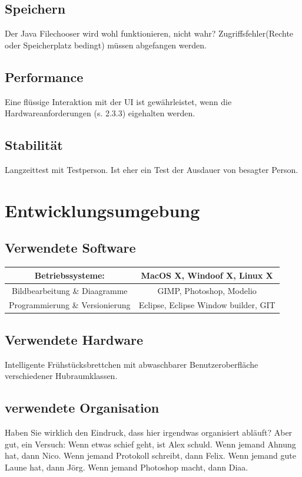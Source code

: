\documentclass[11pt,a4paper]{article}
\begin{document}
\subsection{Speichern}
Der Java Filechooser wird wohl funktionieren, nicht wahr?
Zugriffsfehler(Rechte oder Speicherplatz bedingt) müssen abgefangen werden.


\subsection{Performance}
Eine flüssige Interaktion mit der UI ist gewährleistet, wenn die Hardwareanforderungen (s. 2.3.3) eigehalten werden.

\subsection {Stabilität}
Langzeittest mit Testperson.
Ist eher ein Test der Ausdauer von besagter Person.
\section{Entwicklungsumgebung}
\subsection{Verwendete Software}
\begin{tabular}{|c|c|}
\hline
Betriebssysteme:     &  MacOS X, Windoof X, Linux X
  \\
     \hline
     Bildbearbeitung  \&  Diaagramme & 
         GIMP, Photoshop, Modelio
 \\
     \hline
     Programmierung  \& Versionierung & 
          Eclipse, 
          Eclipse Window builder,
          GIT\\
     \hline
\end{tabular}
\subsection{Verwendete Hardware}
Intelligente Frühstücksbrettchen mit abwaschbarer Benutzeroberfläche verschiedener Hubraumklassen.
\subsection{verwendete Organisation}
Haben Sie wirklich den Eindruck, dass hier irgendwas organisiert abläuft? 
Aber gut, ein Versuch: 
Wenn etwas schief geht, ist Alex schuld.
Wenn jemand Ahnung hat, dann Nico.
Wenn jemand Protokoll schreibt, dann Felix.
Wenn jemand gute Laune hat, dann Jörg.
Wenn jemand Photoshop macht, dann Diaa.
\end{document}
